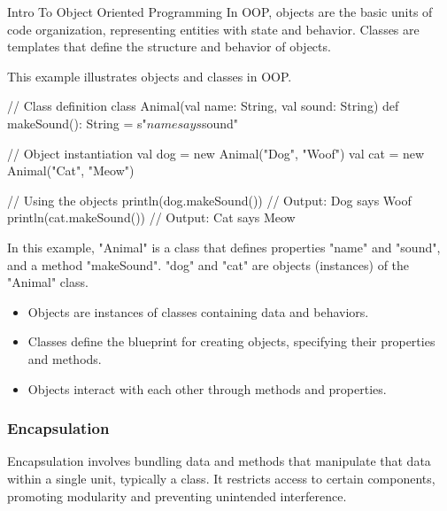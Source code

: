 \begin{notes}{Intro To Object Oriented Programming}
    In OOP, objects are the basic units of code organization, representing entities with state and behavior. Classes are templates that define the structure and behavior of objects.
    
    \begin{highlight}
    
        This example illustrates objects and classes in OOP.
    
    \begin{code}[Scala]
    // Class definition
    class Animal(val name: String, val sound: String) {
        def makeSound(): String = s"$name says $sound"
    }
    
    // Object instantiation
    val dog = new Animal("Dog", "Woof")
    val cat = new Animal("Cat", "Meow")
    
    // Using the objects
    println(dog.makeSound())  // Output: Dog says Woof
    println(cat.makeSound())  // Output: Cat says Meow
    \end{code}
    
        In this example, "Animal" is a class that defines properties "name" and "sound", and a method "makeSound". "dog" and "cat" are objects (instances) of the "Animal" class.
    
        \begin{itemize}
            \item Objects are instances of classes containing data and behaviors.
            \item Classes define the blueprint for creating objects, specifying their properties and methods.
            \item Objects interact with each other through methods and properties.
        \end{itemize}
    
    \end{highlight}
    
    \subsubsection*{Encapsulation}
    
    Encapsulation involves bundling data and methods that manipulate that data within a single unit, typically a class. It restricts access to certain components, promoting modularity and preventing unintended interference.
    
    \begin{highlight}[Encapsulation]
    

\end{highlight}
\end{notes}

